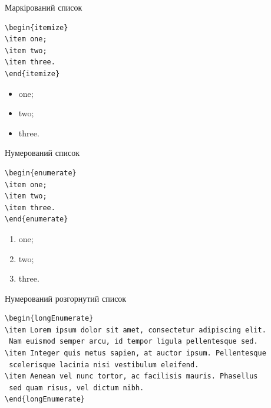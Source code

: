 Маркірований список

\begin{framed}\small
\begin{lstlisting}
\begin{itemize}
\item one;
\item two;
\item three.
\end{itemize}
\end{lstlisting}
\end{framed}

\begin{itemize}
\item one;
\item two;
\item three.
\end{itemize}

Нумерований список

\begin{framed}\small
\begin{lstlisting}
\begin{enumerate}
\item one;
\item two;
\item three.
\end{enumerate}
\end{lstlisting}
\end{framed}

\begin{enumerate}
\item one;
\item two;
\item three.
\end{enumerate}

Нумерований розгорнутий список

\begin{framed}\small
\begin{lstlisting}
\begin{longEnumerate}
\item Lorem ipsum dolor sit amet, consectetur adipiscing elit. 
 Nam euismod semper arcu, id tempor ligula pellentesque sed.
\item Integer quis metus sapien, at auctor ipsum. Pellentesque
 scelerisque lacinia nisi vestibulum eleifend.
\item Aenean vel nunc tortor, ac facilisis mauris. Phasellus
 sed quam risus, vel dictum nibh.
\end{longEnumerate}
\end{lstlisting}
\end{framed}

